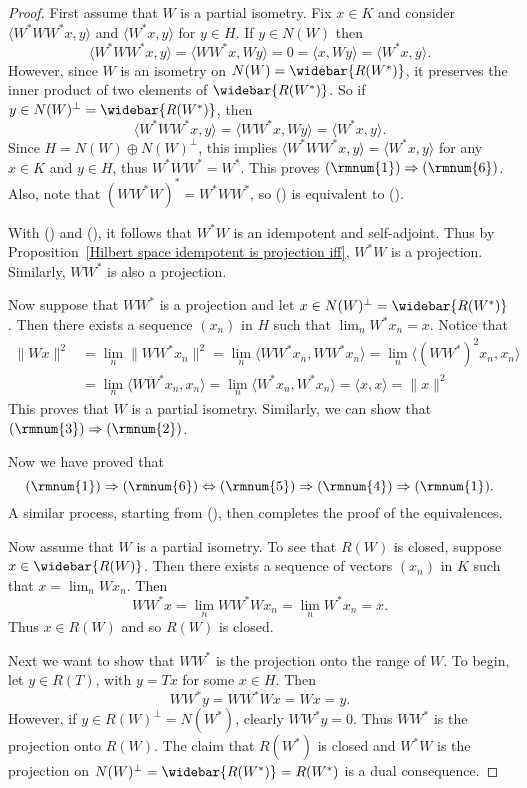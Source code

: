 \begin{proof}
First assume that $W$ is a partial isometry. Fix $x\in K$ and consider $\langle W^*WW^*x,y\rangle$ and $\langle W^*x,y\rangle$ for $y\in H$. If $y\in N(W)$ then
\[\langle W^*WW^*x,y\rangle=\langle WW^*x,Wy\rangle=0=\langle x,Wy\rangle=\langle W^*x,y\rangle.\]
However, since $W$ is an isometry on $N(W)=\widebar{R(W^*)}$, it preserves the inner product of two elements of $\widebar{R(W^*)}$. So if $y\in N(W)^\bot=\widebar{R(W^*)}$, then
\[\langle W^*WW^*x,y\rangle=\langle WW^*x,Wy\rangle=\langle W^*x,y\rangle.\]
Since $H=N(W)\oplus N(W)^\bot$, this implies $\langle W^*WW^*x,y\rangle=\langle W^*x,y\rangle$ for any $x\in K$ and $y\in H$, thus $W^*WW^*=W^*$. This proves $(\rmnum{1})\Rightarrow(\rmnum{6})$. Also, note that $(WW^*W)^*=W^*WW^*$, so () is equivalent to ().\par
With () and (), it follows that $W^*W$ is an idempotent and self-adjoint. Thus by Proposition~\ref{Hilbert space idempotent is projection iff}, $W^*W$ is a projection. Similarly, $WW^*$ is also a projection.\par
Now suppose that $WW^*$ is a projection and let $x\in N(W)^\bot=\widebar{R(W^*)}$. Then there exists a sequence $(x_n)$ in $H$ such that $\lim_nW^*x_n=x$. Notice that
\begin{align*}
\|Wx\|^2&=\lim_n\|WW^*x_n\|^2=\lim_n\langle WW^*x_n,WW^*x_n\rangle=\lim_n\langle (WW^*)^2x_n,x_n\rangle\\
&=\lim_n\langle WW^*x_n,x_n\rangle=\lim_n\langle W^*x_n,W^*x_n\rangle=\langle x,x\rangle=\|x\|^2
\end{align*}
This proves that $W$ is a partial isometry. Similarly, we can show that $(\rmnum{3})\Rightarrow(\rmnum{2})$.\par
Now we have proved that
\[(\rmnum{1})\Rightarrow(\rmnum{6})\Leftrightarrow(\rmnum{5})\Rightarrow(\rmnum{4})\Rightarrow(\rmnum{1}).\]
A similar process, starting from (), then completes the proof of the equivalences.\par
Now assume that $W$ is a partial isometry. To see that $R(W)$ is closed, suppose $x\in\widebar{R(W)}$. Then there exists a sequence of vectors $(x_n)$ in $K$ such that $x=\lim_nWx_n$. Then
\[WW^*x=\lim_nWW^*Wx_n=\lim_nW^*x_n=x.\]
Thus $x\in R(W)$ and so $R(W)$ is closed.\par
Next we want to show that $WW^*$ is the projection onto the range of $W$. To begin, let $y\in R(T)$, with $y=Tx$ for some $x\in H$. Then
\[WW^*y=WW^*Wx=Wx=y.\]
However, if $y\in R(W)^\bot=N(W^*)$, clearly $WW^*y=0$. Thus $WW^*$ is the projection onto $R(W)$. The claim that $R(W^*)$ is closed and $W^*W$ is the projection on $N(W)^\bot=\widebar{R(W^*)}=R(W^*)$ is a dual consequence.
\end{proof}
